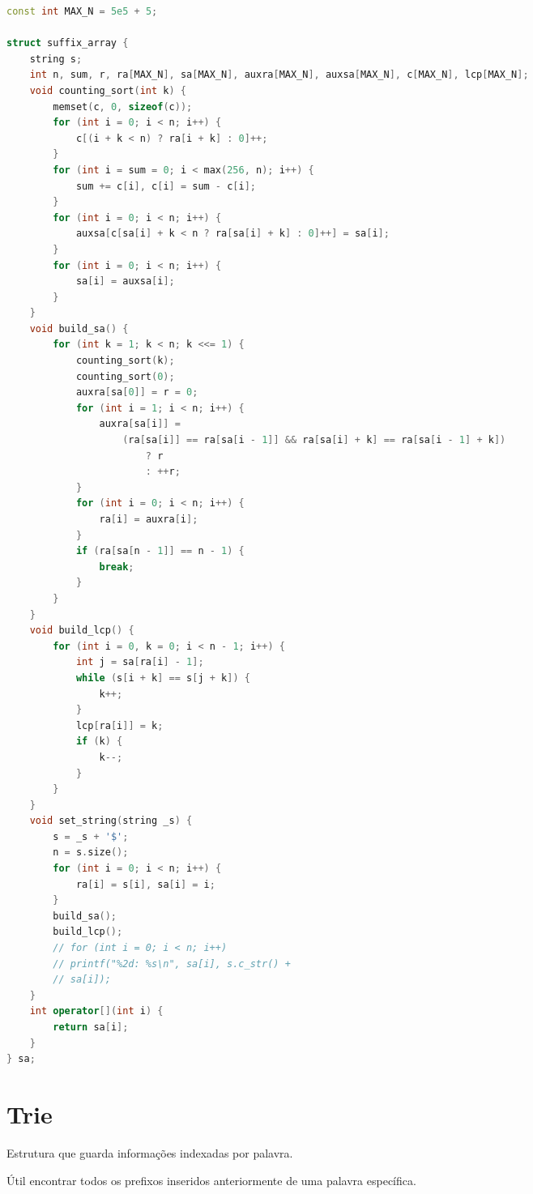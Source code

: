 \documentclass[11pt, a4paper, oneside]{book}
\begin{document}
\begin{multicols}{2}
\begin{lstlisting}[language=C++]
const int MAX_N = 5e5 + 5;

struct suffix_array {
    string s;
    int n, sum, r, ra[MAX_N], sa[MAX_N], auxra[MAX_N], auxsa[MAX_N], c[MAX_N], lcp[MAX_N];
    void counting_sort(int k) {
        memset(c, 0, sizeof(c));
        for (int i = 0; i < n; i++) {
            c[(i + k < n) ? ra[i + k] : 0]++;
        }
        for (int i = sum = 0; i < max(256, n); i++) {
            sum += c[i], c[i] = sum - c[i];
        }
        for (int i = 0; i < n; i++) {
            auxsa[c[sa[i] + k < n ? ra[sa[i] + k] : 0]++] = sa[i];
        }
        for (int i = 0; i < n; i++) {
            sa[i] = auxsa[i];
        }
    }
    void build_sa() {
        for (int k = 1; k < n; k <<= 1) {
            counting_sort(k);
            counting_sort(0);
            auxra[sa[0]] = r = 0;
            for (int i = 1; i < n; i++) {
                auxra[sa[i]] =
                    (ra[sa[i]] == ra[sa[i - 1]] && ra[sa[i] + k] == ra[sa[i - 1] + k])
                        ? r
                        : ++r;
            }
            for (int i = 0; i < n; i++) {
                ra[i] = auxra[i];
            }
            if (ra[sa[n - 1]] == n - 1) {
                break;
            }
        }
    }
    void build_lcp() {
        for (int i = 0, k = 0; i < n - 1; i++) {
            int j = sa[ra[i] - 1];
            while (s[i + k] == s[j + k]) {
                k++;
            }
            lcp[ra[i]] = k;
            if (k) {
                k--;
            }
        }
    }
    void set_string(string _s) {
        s = _s + '$';
        n = s.size();
        for (int i = 0; i < n; i++) {
            ra[i] = s[i], sa[i] = i;
        }
        build_sa();
        build_lcp();
        // for (int i = 0; i < n; i++)
        // printf("%2d: %s\n", sa[i], s.c_str() +
        // sa[i]);
    }
    int operator[](int i) {
        return sa[i];
    }
} sa;
\end{lstlisting}
\end{multicols}

\hfill

\section{Trie}


Estrutura que guarda informações indexadas por palavra.   



Útil encontrar todos os prefixos inseridos anteriormente de uma palavra específica.
\end{document}
